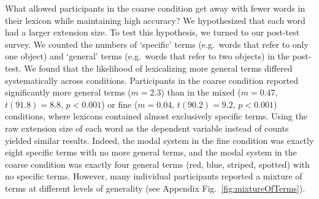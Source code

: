 What allowed participants in the coarse condition get away with fewer words in their lexicon while maintaining high accuracy?
We hypothesized that each word had a larger extension size. 
To test this hypothesis, we turned to our post-test survey.
We counted the numbers of `specific' terms (e.g.~words that refer to only one object) and `general' terms (e.g.~words that refer to two objects) in the post-test. 
We found that the likelihood of lexicalizing more general terms differed systematically across conditions.
Participants in the coarse condition reported significantly more general terms ($m=2.3$) than in the mixed ($m=0.47$, $t(91.8)= 8.8$, $p < 0.001$) or fine ($m = 0.04$, $t(90.2) = 9.2$, $p < 0.001$) conditions, where lexicons contained almost exclusively specific terms.
Using the raw extension size of each word as the dependent variable instead of counts yielded similar results.
Indeed, the modal system in the fine condition was exactly eight specific terms with no more general terms, and the modal system in the coarse condition was exactly four general terms (red, blue, striped, spotted) with no specific terms.
However, many individual participants reported a mixture of terms at different levels of generality (see Appendix Fig.~\ref{fig:mixtureOfTerms}). 



